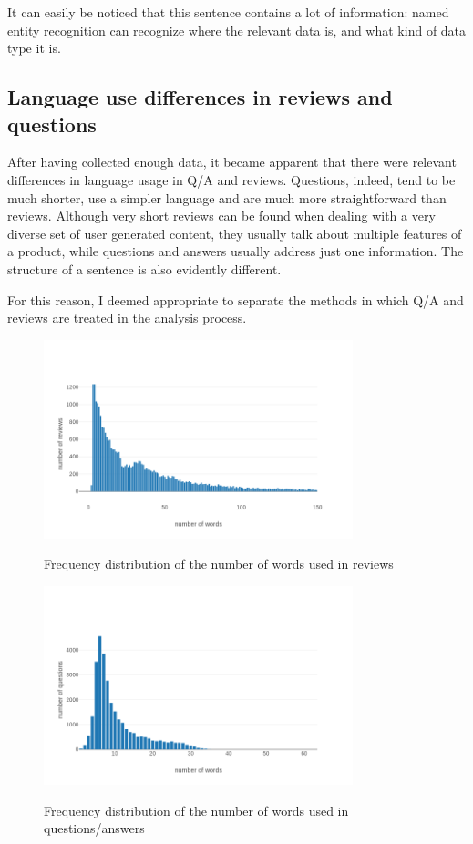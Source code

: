 \documentclass[LaM,binding=0.6cm]{sapthesis}
\begin{document}
It can easily be noticed that this sentence contains a lot of information: named entity recognition can recognize where the relevant data is, and what kind of data type it is.

\subsection{Language use differences in reviews and questions}

After having collected enough data, it became apparent that there were relevant differences in language usage in Q/A and reviews. Questions, indeed, tend to be much shorter, use a simpler language and are much more straightforward than reviews. Although very short reviews can be found when dealing with a very diverse set of user generated content, they usually talk about multiple features of a product, while questions and answers usually address just one information. The structure of a sentence is also evidently different.

For this reason, I deemed appropriate to separate the methods in which Q/A and reviews are treated in the analysis process.

\begin{figure}
\centering
\includegraphics[width=0.8\textwidth]{pictures/reviews_freq_dist.png}\\[3ex]
\caption{Frequency distribution of the number of words used in reviews}
\label{fig:rev-freq-dist}
\end{figure}

\begin{figure}
\centering
\includegraphics[width=0.8\textwidth]{pictures/quest_freq_dist.png}\\[3ex]
\caption{Frequency distribution of the number of words used in questions/answers}
\label{fig:quest-freq-dist}
\end{figure}
\end{document}
